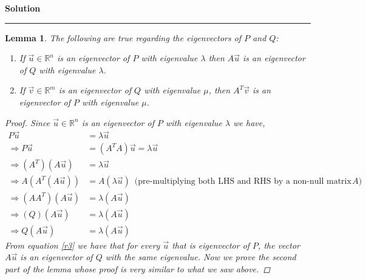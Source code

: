 \documentclass[a4paper,12pt]{article}
\newenvironment{solution}[2][]{%
    \begin{mdframed}[linecolor=blue!70!black, linewidth=2pt, roundcorner=10pt, backgroundcolor=yellow!10!white, skipabove=12pt, skipbelow=12pt]%
        \textbf{\large #2}
        \par\noindent\rule{\textwidth}{0.4pt}
}{
    \end{mdframed}
}
\newtheorem{lemma}{Lemma}
\begin{document}
\begin{solution}{Solution}
        \begin{lemma}\label{l2}The following are true regarding the eigenvectors of $P$ and $Q$:
          \begin{enumerate}
            \item If $\vec{u} \in \mathbb{R}^{n}$ is an eigenvector of $P$ with eigenvalue $\lambda$ then $A\vec{u}$ is an eigenvector of 
            $Q$ with eigenvalue $\lambda$.
            \item If $\vec{v} \in \mathbb{R}^{m}$ is an eigenvector of $Q$ with eigenvalue $\mu$, then $A^{T} \vec{v}$ is an eigenvector of $P$ with eigenvalue $\mu$.
        \end{enumerate}
          \begin{proof}
            Since $\vec{u} \in \mathbb{R}^{n}$ is an eigenvector of $P$ with eigenvalue $\lambda$ we have,
            \begin{align}
              P\vec{u} &= \lambda \vec{u} \nonumber \\
              \Rightarrow P\vec{u} &= (A^{T}A) \vec{u} = \lambda \vec{u} \nonumber \\
              \Rightarrow (A^{T}) (A \vec{u}) &= \lambda \vec{u} \nonumber \\
              \Rightarrow A \left( A^{T} (A\vec{u})\right) &= A \left( \lambda \vec{u}\right) \nonumber \, \text{ (pre-multiplying both LHS and RHS by a non-null matrix $A$)} \nonumber \\
              \Rightarrow  (A A^{T}) (A\vec{u}) &= \lambda (A \vec{u}) \nonumber \\
              \Rightarrow (Q) (A\vec{u}) &= \lambda (A\vec{u}) \nonumber \\
              \Rightarrow  \label{r3}Q (A\vec{u}) &= \lambda (A\vec{u})
            \end{align}
            From equation \@\ref{r3} we have that for every $\vec{u}$ that is eigenvector of $P$, the vector $A\vec{u}$
            is an eigenvector of $Q$ with the same eigenvalue. Now we prove the second part of the lemma whose proof is very
            similar to what we saw above.


\end{proof}
\end{lemma}
\end{solution}
\end{document}

